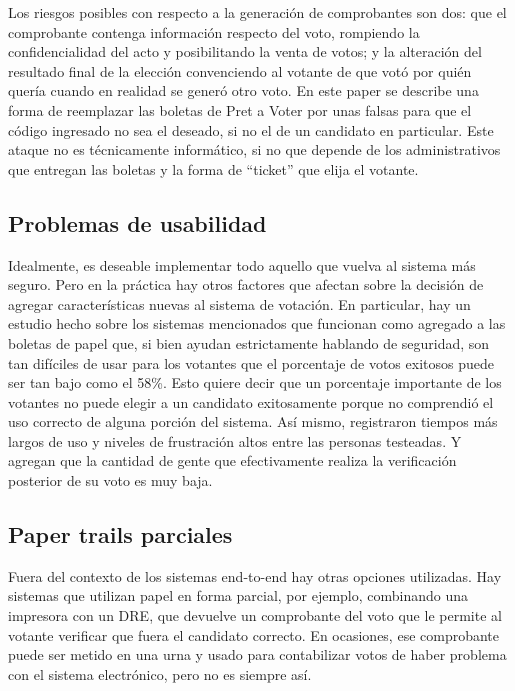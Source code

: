 Los riesgos posibles con respecto a la generación de comprobantes son dos: que el comprobante contenga información respecto del voto, rompiendo la confidencialidad del acto y posibilitando la venta de votos; y la alteración del resultado final de la elección convenciendo al votante de que votó por quién quería cuando en realidad se generó otro voto.
En este paper\cite{kelsey} se describe una forma de reemplazar las boletas de Pret a Voter por unas falsas para que el código ingresado no sea el deseado, si no el de un candidato en particular. Este ataque no es técnicamente informático, si no que depende de los administrativos que entregan las boletas y la forma de “ticket” que elija el votante.


\subsection{Problemas de usabilidad}

Idealmente, es deseable implementar todo aquello que vuelva al sistema más seguro. Pero en la práctica hay otros factores que afectan sobre la decisión de agregar características nuevas al sistema de votación. En particular, hay un estudio hecho sobre los sistemas mencionados que funcionan como agregado a las boletas de papel que, si bien ayudan estrictamente hablando de seguridad, son tan difíciles de usar para los votantes que el porcentaje de votos exitosos puede ser tan bajo como el 58\%\cite{usability}. Esto quiere decir que un porcentaje importante de los votantes no puede elegir a un candidato exitosamente porque no comprendió el uso correcto de alguna porción del sistema. Así mismo, registraron tiempos más largos de uso y niveles de frustración altos entre las personas testeadas. Y agregan que la cantidad de gente que efectivamente realiza la verificación posterior de su voto es muy baja.

\subsection{Paper trails parciales}

Fuera del contexto de los sistemas end-to-end hay otras opciones utilizadas. Hay sistemas que utilizan papel en forma parcial, por ejemplo, combinando una impresora con un DRE, que devuelve un comprobante del voto que le permite al votante verificar que fuera el candidato correcto. En ocasiones, ese comprobante puede ser metido en una urna y usado para contabilizar votos de haber problema con el sistema electrónico, pero no es siempre así.


